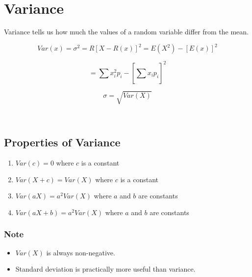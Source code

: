 \documentclass[english,course]{lecture}
\begin{document}
\section{Variance}

Variance tells us how much the values of a random variable differ from the mean.

$$Var(x) = \sigma^2 = R[X-R(x)]^2 = E(X^2) - [E(x)]^2$$

$$ = \sum_{}^{}x_i^2 p_i - [\sum_{}^{}x_i p_i]^2$$

$$\sigma = \sqrt{Var(X)}$$

\\

\subsection{Properties of Variance}

\begin{enumerate}
  \item $Var(c) = 0$ where $c$ is a constant
  \item $Var(X + c) = Var(X)$ where $c$ is a constant
  \item $Var(aX) = a^2 Var(X)$ where $a$ and $b$ are constants
  \item $Var(aX + b) = a^2 Var(X)$ where $a$ and $b$ are constants
\end{enumerate}

\subsubsection*{Note}

\begin{itemize}
  \item $Var(X)$ is always non-negative.
  \item Standard deviation is practically more useful than variance.
\end{itemize}
\end{document}
